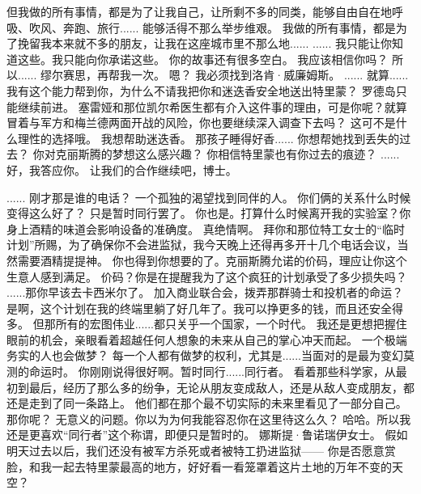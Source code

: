 \documentclass[openany]{book}
\begin{document}
\begin{dialogue}
     但我做的所有事情，都是为了让我自己，让所剩不多的同类，能够自由自在地呼吸、吹风、奔跑、旅行......
     能够活得不那么举步维艰。
     我做的所有事情，都是为了挽留我本来就不多的朋友，让我在这座城市里不那么地......
     ......
     我只能让你知道这些。我只能向你承诺这些。
     你的故事还有很多空白。
     我应该相信你吗？
     所以......
     缪尔赛思，再帮我一次。
     嗯？
     我必须找到洛肯·威廉姆斯。
     ......
     就算......我有这个能力帮到你，为什么不请我把你和迷迭香安全地送出特里蒙？
     罗德岛只能继续前进。
     塞雷娅和那位凯尔希医生都有介入这件事的理由，可是你呢？就算冒着与军方和梅兰德两面开战的风险，你也要继续深入调查下去吗？
     这可不是什么理性的选择哦。
     我想帮助迷迭香。
     那孩子睡得好香......
     你想帮她找到丢失的过去？
     你对克丽斯腾的梦想这么感兴趣？
     你相信特里蒙也有你过去的痕迹？
     ......好，我答应你。
     让我们的合作继续吧，博士。
\end{dialogue}

\begin{dialogue}
     ......
     刚才那是谁的电话？
     一个孤独的渴望找到同伴的人。
     你们俩的关系什么时候变得这么好了？
     只是暂时同行罢了。
     你也是。打算什么时候离开我的实验室？你身上酒精的味道会影响设备的准确度。
     真绝情啊。
     拜你和那位特工女士的“临时计划”所赐，为了确保你不会进监狱，我今天晚上还得再多开十几个电话会议，当然需要酒精提提神。
     你也得到你想要的了。克丽斯腾允诺的价码，理应让你这个生意人感到满足。
     价码？你是在提醒我为了这个疯狂的计划承受了多少损失吗？
     ......那你早该去卡西米尔了。
     加入商业联合会，拨弄那群骑士和投机者的命运？
     是啊，这个计划在我的终端里躺了好几年了。我可以挣更多的钱，而且还安全得多。
     但那所有的宏图伟业......都只关乎一个国家，一个时代。
     我还是更想把握住眼前的机会，亲眼看着超越任何人想象的未来从自己的掌心冲天而起。
     一个极端务实的人也会做梦？
     每一个人都有做梦的权利，尤其是......当面对的是最为变幻莫测的命运时。
     你刚刚说得很好啊。暂时同行......同行者。
     看着那些科学家，从最初到最后，经历了那么多的纷争，无论从朋友变成敌人，还是从敌人变成朋友，都还是走到了同一条路上。
     他们都在那个最不切实际的未来里看见了一部分自己。
     那你呢？
     无意义的问题。你以为为何我能容忍你在这里待这么久？
     哈哈。所以我还是更喜欢“同行者”这个称谓，即便只是暂时的。
     娜斯提·鲁诺瑞伊女士。
     假如明天过去以后，我们还没有被军方杀死或者被特工扔进监狱——
     你是否愿意赏脸，和我一起去特里蒙最高的地方，好好看一看笼罩着这片土地的万年不变的天空？
\end{dialogue}
\end{document}
